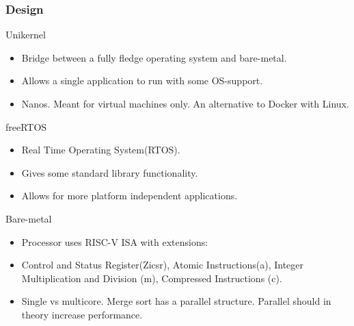 \begin{frame}[hoved]
	\frametitle{Design}
  {\large Unikernel}
  \begin{itemize}
    \item Bridge between a fully fledge operating system and bare-metal.
    \item Allows a single application to run with some OS-support.
    \item Nanos. Meant for virtual machines only. An alternative to Docker with
      Linux.
  \end{itemize}
  {\large freeRTOS}
  \begin{itemize}
    \item Real Time Operating System(RTOS).
    \item Gives some standard library functionality.
    \item Allows for more platform independent applications.
  \end{itemize}
	{\large Bare-metal}
	\begin{itemize}
		\item Processor uses RISC-V ISA with extensions:
    \item Control and Status Register(Zicsr), Atomic Instructions(a), Integer
      Multiplication and Division (m), Compressed Instructions (c).
    \item Single vs multicore. Merge sort has a parallel structure. Parallel
      should in theory increase performance.
	\end{itemize}
\end{frame}

